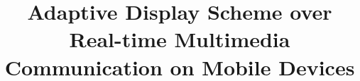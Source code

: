 \documentclass[conference]{./IEEEtran}
\begin{document}
\title{Adaptive Display Scheme over Real-time Multimedia Communication on Mobile Devices}







\maketitle

















{
 \begin{footnotesize}
    
 \end{footnotesize}
}


%


\end{document}
